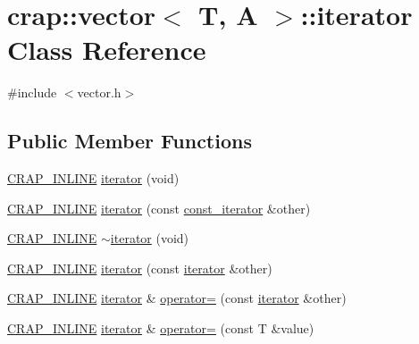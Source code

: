 \hypertarget{classcrap_1_1vector_1_1iterator}{\section{crap\+:\+:vector$<$ T, A $>$\+:\+:iterator Class Reference}
\label{classcrap_1_1vector_1_1iterator}
}


{\ttfamily \#include $<$vector.\+h$>$}

\subsection*{Public Member Functions}
\begin{DoxyCompactItemize}
\item 
\hyperlink{config__x86_8h_a5a40526b8d842e7ff731509998bb0f1c}{C\+R\+A\+P\+\_\+\+I\+N\+L\+I\+N\+E} \hyperlink{classcrap_1_1vector_1_1iterator_a14215f49fc68be8787cd7774cabe17c8}{iterator} (void)
\item 
\hyperlink{config__x86_8h_a5a40526b8d842e7ff731509998bb0f1c}{C\+R\+A\+P\+\_\+\+I\+N\+L\+I\+N\+E} \hyperlink{classcrap_1_1vector_1_1iterator_afa37549208d45f5dd674c58580a5ecd9}{iterator} (const \hyperlink{classcrap_1_1vector_1_1const__iterator}{const\+\_\+iterator} \&other)
\item 
\hyperlink{config__x86_8h_a5a40526b8d842e7ff731509998bb0f1c}{C\+R\+A\+P\+\_\+\+I\+N\+L\+I\+N\+E} \hyperlink{classcrap_1_1vector_1_1iterator_a7c9e6fc60b6fac853d32db6c66850d1f}{$\sim$iterator} (void)
\item 
\hyperlink{config__x86_8h_a5a40526b8d842e7ff731509998bb0f1c}{C\+R\+A\+P\+\_\+\+I\+N\+L\+I\+N\+E} \hyperlink{classcrap_1_1vector_1_1iterator_add25d8a5337ef7cda1992eea4828a2b5}{iterator} (const \hyperlink{classcrap_1_1vector_1_1iterator}{iterator} \&other)
\item 
\hyperlink{config__x86_8h_a5a40526b8d842e7ff731509998bb0f1c}{C\+R\+A\+P\+\_\+\+I\+N\+L\+I\+N\+E} \hyperlink{classcrap_1_1vector_1_1iterator}{iterator} \& \hyperlink{classcrap_1_1vector_1_1iterator_acfadaf5cfd40e403d21e480fbc47150f}{operator=} (const \hyperlink{classcrap_1_1vector_1_1iterator}{iterator} \&other)
\item 
\hyperlink{config__x86_8h_a5a40526b8d842e7ff731509998bb0f1c}{C\+R\+A\+P\+\_\+\+I\+N\+L\+I\+N\+E} \hyperlink{classcrap_1_1vector_1_1iterator}{iterator} \& \hyperlink{classcrap_1_1vector_1_1iterator_aea59bd3bcb509766e488d0b347d1b18a}{operator=} (const T \&value)
\item 

\end{DoxyCompactItemize}
